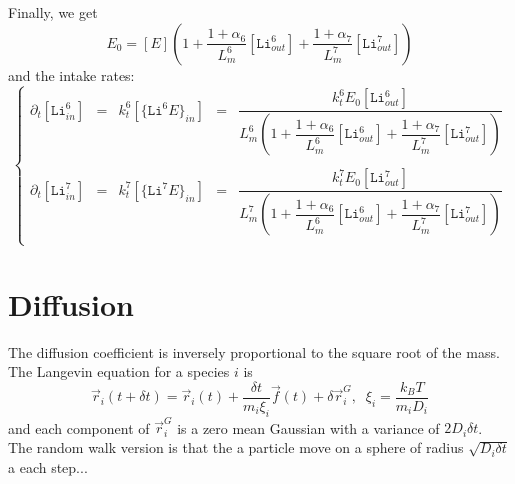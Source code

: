 \documentclass[aps,onecolumn]{revtex4}
\newcommand{\mychem}[1]{\mathtt{#1}}
\begin{document}
Finally, we get
\begin{equation}
	E_0 = [E] \left( 1 + \dfrac{1+\alpha_6}{L_m^6} [\mathtt{Li}^6_{out}] + \dfrac{1+\alpha_7}{L_m^7} [\mathtt{Li}^7_{out}] \right)
\end{equation}
and the intake rates:
\begin{equation}
	\left\lbrace
	\begin{array}{rclcl}
	\partial_t [\mychem{Li}^6_{in}] & = & k_t^6[\lbrace\mychem{Li}^6E\rbrace_{in}] & = & 
	\dfrac{k_t^6E_0[\mathtt{Li}^6_{out}]}{L_m^6\left( 1 + \dfrac{1+\alpha_6}{L_m^6} [\mathtt{Li}^6_{out}] + \dfrac{1+\alpha_7}{L_m^7} [\mathtt{Li}^7_{out}] \right)} \\
	\\
	\partial_t [\mychem{Li}^7_{in}] & = & k_t^7[\lbrace\mychem{Li}^7E\rbrace_{in}] & = & 
	\dfrac{k_t^7E_0[\mathtt{Li}^7_{out}]}{L_m^7\left( 1 + \dfrac{1+\alpha_6}{L_m^6} [\mathtt{Li}^6_{out}] + \dfrac{1+\alpha_7}{L_m^7} [\mathtt{Li}^7_{out}] \right)} \\
	\end{array}
	\right.
\end{equation}


\section{Diffusion}
The diffusion coefficient is inversely proportional to the square root of the mass. The Langevin equation for a species $i$ is
\begin{equation}
	\vec{r}_i\left(t+\delta t\right) = \vec{r}_i\left(t\right)  + \dfrac{\delta t}{m_i\xi_i} \vec{f}(t) + \delta \vec{r}_i^G, \;\;\xi_i = \dfrac{k_BT}{m_iD_i}
\end{equation}
and each component of $\vec{r}_i^G$ is a zero mean Gaussian with a variance of $2D_i\delta t$.\\
The random walk version is that the a particle move on a sphere of radius $\sqrt{D_i\delta t}$ a each step...
\end{document}
